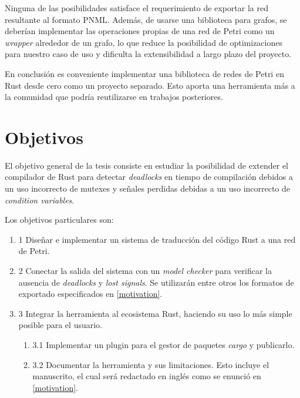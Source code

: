 \documentclass[12pt]{article}
\begin{document}
Ninguna de las posibilidades satisface el requerimiento de exportar la red resultante al formato PNML.
Además, de usarse una biblioteca para grafos, se deberían implementar las operaciones propias de una red de Petri como un \textit{wrapper} alrededor de un grafo,
lo que reduce la posibilidad de optimizaciones para nuestro caso de uso y dificulta la extensibilidad a largo plazo del proyecto.

En conclusión es conveniente implementar una biblioteca de redes de Petri en Rust desde cero como un proyecto separado.
Esto aporta una herramienta más a la comunidad que podría reutilizarse en trabajos posteriores.

\bigskip

\section{Objetivos}

El objetivo general de la tesis consiste en estudiar la posibilidad de extender el compilador de Rust
para detectar \textit{deadlocks} en tiempo de compilación debidos a un uso incorrecto de mutexes
y señales perdidas debidas a un uso incorrecto de \textit{condition variables}.

Los objetivos particulares son:

\begin{enumerate}
    \item 1 Diseñar e implementar un sistema de traducción del código Rust a una red de Petri.
    \item 2 Conectar la salida del sistema con un \textit{model checker} para verificar la ausencia de \textit{deadlocks} y \textit{lost signals}.
          Se utilizarán entre otros los formatos de exportado especificados en \ref{motivation}.
    \item 3 Integrar la herramienta al ecosistema Rust, haciendo su uso lo más simple posible para el usuario.
          \begin{enumerate}
              \item 3.1 Implementar un plugin para el gestor de paquetes \textit{cargo} y publicarlo.
              \item 3.2 Documentar la herramienta y sus limitaciones.
                    Esto incluye el manuscrito, el cual será redactado en inglés como se enunció en \ref{motivation}.
          \end{enumerate}
\end{enumerate}

\bigskip
\end{document}
